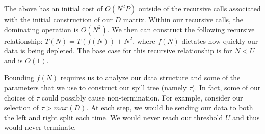 \vspace{5 mm}
\noindent
The above has an initial cost of $O(N^{2} P)$ outside of the recursive calls 
associated with the initial construction of our $D$ matrix. Within our 
recursive calls, the dominating operation is $O(N^{2})$. We then can 
construct the following recursive relationship: $T(N) = T(f(N)) + N^{2}$, 
where $f(N)$ dictates how quickly our data is being depleted. The base case for 
this recursive relationship is for $N < U$ and is $O(1)$.

\vspace{5 mm}
\noindent
Bounding $f(N)$ requires us to analyze our data structure and some of the 
parameters that we use to construct our spill tree (namely $\tau$). In fact, 
some of our choices of $\tau$ could possibly cause non-termination. For 
example, consider our selection of $\tau > max(D)$. At each step, we would be 
sending our data to both the left and right split each time. We would never 
reach our threshold $U$ and thus would never terminate.

\newpage
